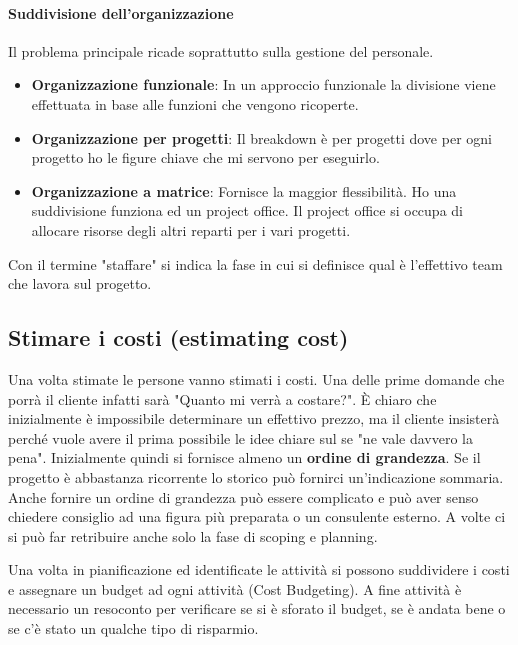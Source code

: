 \paragraph{Suddivisione dell'organizzazione}
Il problema principale ricade soprattutto sulla gestione del personale.
\begin{itemize}
	\item \textbf{Organizzazione funzionale}: In un approccio funzionale la divisione viene effettuata in base alle funzioni che vengono ricoperte.
	\item \textbf{Organizzazione per progetti}: Il breakdown è per progetti dove per ogni progetto ho le figure chiave che mi servono per eseguirlo.
	\item \textbf{Organizzazione a matrice}: Fornisce la maggior flessibilità. Ho una suddivisione funziona ed un project office. Il project office si occupa di allocare risorse degli altri reparti per i vari progetti.
\end{itemize}
\begin{info}[Staffare:]
	Con il termine "staffare" si indica la fase in cui si definisce qual è l'effettivo team che lavora sul progetto.
\end{info}
\subsection{Stimare i costi (estimating cost)}
Una volta stimate le persone vanno stimati i costi. Una delle prime domande che porrà il cliente infatti sarà "Quanto mi verrà a costare?". È chiaro che inizialmente è impossibile determinare un effettivo prezzo, ma il cliente insisterà perché vuole avere il prima possibile le idee chiare sul se "ne vale davvero la pena". Inizialmente quindi si fornisce almeno un \textbf{ordine di grandezza}. Se il progetto è abbastanza ricorrente lo storico può fornirci un'indicazione sommaria. Anche fornire un ordine di grandezza può essere complicato e può aver senso chiedere consiglio ad una figura più preparata o un consulente esterno. A volte ci si può far retribuire anche solo la fase di scoping e planning.

\noindent Una volta in pianificazione ed identificate le attività si possono suddividere i costi e assegnare un budget ad ogni attività (Cost Budgeting). A fine attività è necessario un resoconto per verificare se si è sforato il budget, se è andata bene o se c'è stato un qualche tipo di risparmio.

